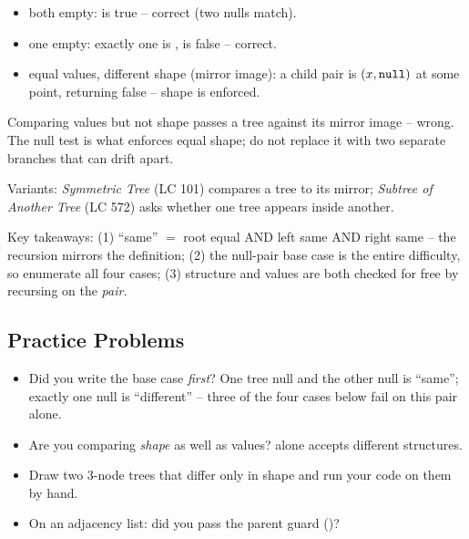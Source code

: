 \begin{itemize}[nosep]
  \item both empty:  is true -- correct (two nulls match).
  \item one empty: exactly one is \nil,  is false -- correct.
  \item equal values, different shape (mirror image): a child pair is $(x,\texttt{null})$ at some
        point, returning false -- shape is enforced. \hfill{}
\end{itemize}

\begin{warningbox}
Comparing values but not shape passes a tree against its mirror image -- wrong. The
 null test is what enforces equal shape; do not replace it with two
separate  branches that can drift apart.
\end{warningbox}
Variants: \emph{Symmetric Tree} (LC 101) compares a tree to its mirror; \emph{Subtree of
Another Tree} (LC 572) asks whether one tree appears inside another.

\begin{insightbox}
Key takeaways: (1) ``same'' $=$ root equal AND left same AND right same -- the recursion
mirrors the definition; (2) the null-pair base case is the entire difficulty, so enumerate
all four cases; (3) structure and values are both checked for free by recursing on the
\emph{pair}.
\end{insightbox}

\subsection{Practice Problems}

\begin{stuckbox}
\begin{itemize}[nosep, leftmargin=1.4em]
  \item Did you write the base case \emph{first}? One tree null and the other null is
        ``same''; exactly one null is ``different'' -- three of the four cases below
        fail on this pair alone.
  \item Are you comparing \emph{shape} as well as values?  alone
        accepts different structures.
  \item Draw two 3-node trees that differ only in shape and run your code on them by hand.
  \item On an adjacency list: did you pass the parent guard ()?
\end{itemize}
\end{stuckbox}

